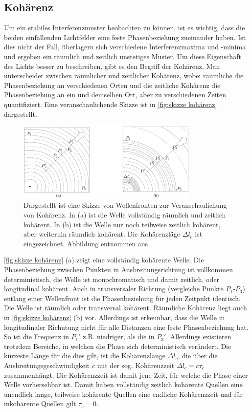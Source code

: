 \subsection{Kohärenz}
\label{ssec:Kohärenz}
Um ein stabiles Interferenzmuster beobachten zu können, ist es wichtig, dass die beiden einfallenden Lichtfelder eine feste Phasenbeziehung zueinander haben. 
Ist dies nicht der Fall, überlagern sich verschiedene Interferenzmaxima und -minima und ergeben ein räumlich und zeitlich unstetiges Muster. 
Um diese Eigenschaft des Lichts besser zu beschreiben, gibt es den Begriff der Kohärenz.
Man unterscheidet zwischen räumlicher und zeitlicher Kohärenz, wobei räumliche die Phasenbeziehung an verschiedenen Orten und die zeitliche Kohärenz die Phasenbeziehung an ein und demselben Ort, aber zu verschiedenen Zeiten quantifiziert. \cite[Kap. 9.2]{hechtOptik2018}
Eine veranschaulichende Skizze ist in \autoref{fig:skizze kohärenz} dargestellt.
\begin{figure}[htbp]
    \centering
    \includegraphics[width=0.8\textwidth]{images/Theorie/Hecht_9.6.png}
    \caption{Dargestellt ist eine Skizze von Wellenfronten zur Veranschaulichung von Kohärenz. In (a) ist die Welle vollständig räumlich und zeitlich kohärent. In (b) ist die Welle nur noch teilweise zeitlich kohärent, aber weiterhin räumlich kohärent. Die Kohärenzläge $\Delta l_c$ ist eingezeichnet. Abbildung entnommen aus \cite{hechtOptik2018}.}
    \label{fig:skizze kohärenz}
\end{figure}
\autoref{fig:skizze kohärenz} (a) zeigt eine vollständig kohärente Welle. Die Phasenbeziehung zwischen Punkten in Ausbreitungsrichtung ist vollkommen deterministisch, die Welle ist monochromatisch und damit zeitlich, oder longitudinal kohärent. 
Auch in transversaler Richtung (vergleiche Punkte $P_1$-$P_3$) entlang einer Wellenfront ist die Phasenbeziehung für jeden Zeitpukt identisch. 
Die Welle ist räumlich oder transversal kohärent. 
Räumliche Kohärenz liegt auch in \autoref{fig:skizze kohärenz} (b) vor. 
Allerdings ist erkennbar, dass die Welle in longitudinaler Richutung nicht für alle Distanzen eine feste Phasenbeziehung hat. 
So ist die Frequenz in $P_1'$ z.B. niedriger, als die in $P_3'$. 
Allerdings existieren trotzdem Bereiche, in welchen die Phase sich deterministisch verändert. 
Die kürzeste Länge für die dies gilt, ist die Kohärenzlänge $\Delta l_c$, die über die Ausbreitungsgeschwindigkeit $c$ mit der sog. Kohärenzzeit $\Delta l_c = c\tau_c$ zusammenhängt. 
Die Kohärenzzeit ist damit jene Zeit, für welche die Phase einer Welle vorhersehbar ist. 
Damit haben vollständig zeitlich kohärente Quellen eine unendlich lange, teilweise kohärente Quellen eine endliche Kohärenzzeit und für inkohärente Quellen gilt $\tau_c =0$. 

